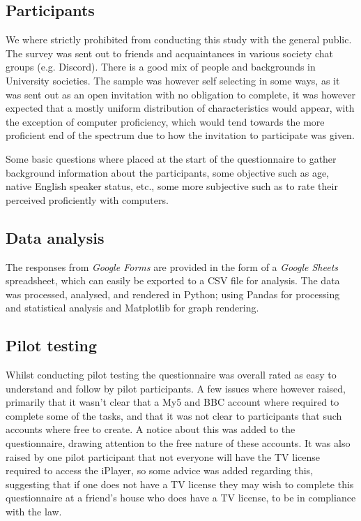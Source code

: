 \documentclass[12pt,a4paper,x11names]{article}
\begin{document}
\subsection{Participants}
We where strictly prohibited from conducting this study with the general public. The survey was sent out to friends and acquaintances in various society chat groups (e.g. Discord). There is a good mix of people and backgrounds in University societies. The sample was however self selecting in some ways, as it was sent out as an open invitation with no obligation to complete, it was however expected that a mostly uniform distribution of characteristics would appear, with the exception of computer proficiency, which would tend towards the more proficient end of the spectrum due to how the invitation to participate was given.

Some basic questions where placed at the start of the questionnaire to gather background information about the participants, some objective such as age, native English speaker status, etc., some more subjective such as to rate their perceived proficiently with computers.

\subsection{Data analysis}
The responses from \textit{Google Forms} are provided in the form of a \textit{Google Sheets} spreadsheet, which can easily be exported to a CSV file for analysis. The data was processed, analysed, and rendered in Python; using Pandas for processing and statistical analysis and Matplotlib for graph rendering. 

\subsection{Pilot testing}
Whilst conducting pilot testing the questionnaire was overall rated as easy to understand and follow by pilot participants. A few issues where however raised, primarily that it wasn't clear that a My5 and BBC account where required to complete some of the tasks, and that it was not clear to participants that such accounts where free to create. A notice about this was added to the questionnaire, drawing attention to the free nature of these accounts. It was also raised by one pilot participant that not everyone will have the TV license required to access the iPlayer, so some advice was added regarding this, suggesting that if one does not have a TV license they may wish to complete this questionnaire at a friend's house who does have a TV license, to be in compliance with the law.
\end{document}
